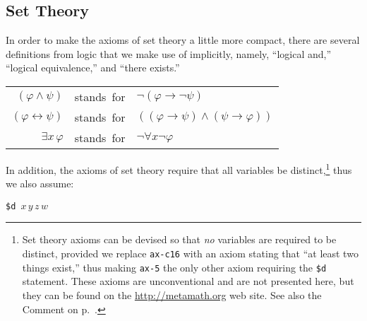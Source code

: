 %

\subsection{Set Theory}\label{mmsettheoryaxioms}

In order to make the axioms of set theory a little
more compact, there are several definitions from logic that we make use of
implicitly, namely, ``logical {\sc and},''
 ``logical equivalence,'' and
``there exists.''

\begin{center}\begin{tabular}{rcl}
  $( \varphi \wedge \psi )$ &\mbox{stands for}& $\neg ( \varphi
     \rightarrow \neg \psi )$\\
  $( \varphi \leftrightarrow \psi )$& \mbox{stands
     for}& $( ( \varphi \rightarrow \psi ) \wedge
     ( \psi \rightarrow \varphi ) )$\\
  $\exists x \,\varphi$ &\mbox{stands for}& $\neg \forall x \neg \varphi$
\end{tabular}\end{center}

In addition, the axioms of set theory require that all variables be
dis\-tinct,\footnote{Set theory axioms can be
devised so that {\em no} variables are required to be distinct,
provided we replace \texttt{ax-c16} with an axiom stating that ``at
least two things exist,'' thus
making \texttt{ax-5} the only other axiom requiring the
\texttt{\$d} statement.  These axioms are unconventional and are not
presented here, but they can be found on the \url{http://metamath.org}
web site.  See also the Comment on
p.~\pageref{nodd}.} thus we also assume:
\begin{center}
  \texttt{\$d }$x\,y\,z\,w$
\end{center}

